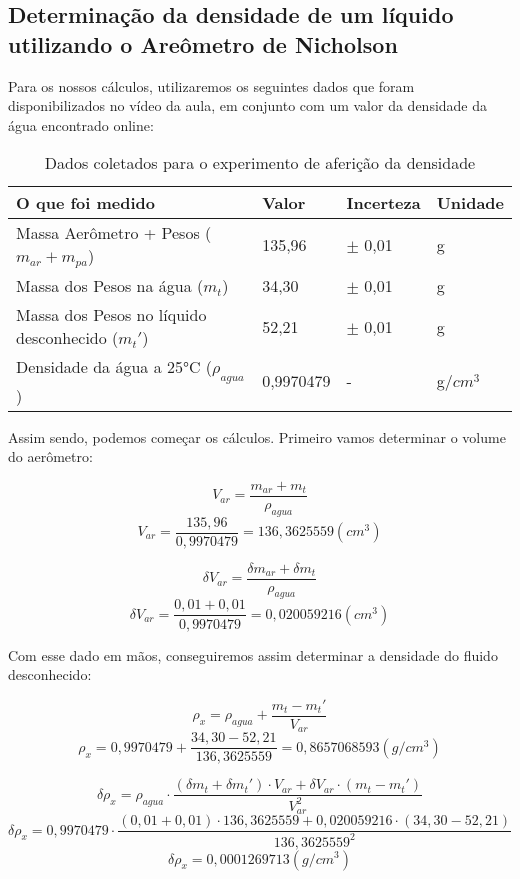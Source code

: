 \subsection{Determinação da densidade de um líquido utilizando o
Areômetro de Nicholson}

Para os nossos cálculos, utilizaremos os seguintes dados que foram disponibilizados no vídeo da aula, em conjunto com um valor da densidade da água encontrado online:

\begin{table}[H]
    \centering
    \begin{tabular}{ |M{5cm}||M{2cm}||M{2cm}||M{2cm}|  }
        \hline
        \textbf{O que foi medido} & \textbf{Valor} & \textbf{Incerteza} & \textbf{Unidade}\\
        \hline
        Massa Aerômetro + Pesos ($m_{ar} + m_{pa}$)         & 135,96    & $\pm$ 0,01 & g\\
        Massa dos Pesos na água ($m_t$)                     & 34,30     & $\pm$ 0,01 & g\\
        Massa dos Pesos no líquido desconhecido ($m_t'$)    & 52,21     & $\pm$ 0,01 & g\\
        \hline
        Densidade da água a 25°C ($\rho _{agua}$)           & 0,9970479 & - & g/$cm^3$\\
        \hline
    \end{tabular}
    \caption{Dados coletados para o experimento de aferição da densidade}
\end{table}

Assim sendo, podemos começar os cálculos. Primeiro vamos determinar o volume do aerômetro:

\[ V_{ar} = \frac{m_{ar} + m_t}{\rho _{agua}} \]
\[ V_{ar} = \frac{135,96}{0,9970479} = 136,3625559 (cm^3) \]

\[ \delta V_{ar} = \frac{\delta m_{ar} + \delta m_t}{\rho _{agua}} \]
\[ \delta V_{ar} = \frac{0,01 + 0,01}{0,9970479} = 0,020059216 (cm^3) \]

Com esse dado em mãos, conseguiremos assim determinar a densidade do fluido desconhecido:

\[ \rho _x = \rho _{agua} + \frac{m_t - m_t'}{V_{ar}} \]
\[ \rho _x = 0,9970479 + \frac{34,30 - 52,21}{136,3625559} = 0,8657068593 (g/cm^3) \]

\[ \delta \rho _x = \rho _{agua} \cdot \frac{(\delta m_t + \delta m_t') \cdot V_{ar} + \delta V_{ar} \cdot (m_t - m_t')}{V_{ar}^2} \]
\[ \delta \rho _x = 0,9970479 \cdot \frac{(0,01 + 0,01) \cdot 136,3625559 + 0,020059216 \cdot (34,30 - 52,21)}{136,3625559^2} \]
\[ \delta \rho _x = 0,0001269713 (g/cm^3) \]


